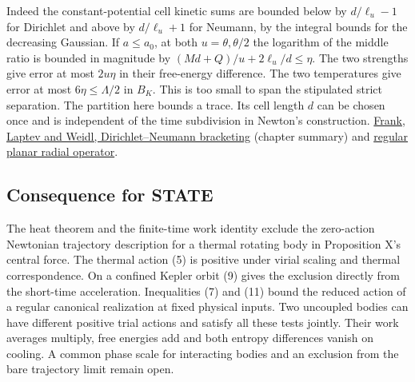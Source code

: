 \documentclass[11pt,a4paper]{article}
\begin{document}
Indeed the constant-potential cell kinetic sums are bounded below by
\(d/\ell_u-1\) for Dirichlet and above by \(d/\ell_u+1\) for Neumann, by
the integral bounds for the decreasing Gaussian. If \(a\le a_0\), at
both \(u=\theta,\theta/2\) the logarithm of the middle ratio is bounded
in magnitude by \((Md+Q)/u+2\ell_u/d\le\eta\). The two strengths give
error at most \(2u\eta\) in their free-energy difference. The two
temperatures give error at most \(6\eta\le\Lambda/2\) in \(B_K\). This
is too small to span the stipulated strict separation. The partition
here bounds a trace. Its cell length \(d\) can be chosen once and is
independent of the time subdivision in Newton's construction.
\href{https://doi.org/10.1017/9781009218436.007}{Frank, Laptev and
Weidl, Dirichlet--Neumann bracketing} (chapter summary) and
\href{self-sufficiency-contrast.md\#passivity-under-cyclic-changes-of-the-attraction}{regular
planar radial operator}.

\subsection{Consequence for STATE}\label{consequence-for-state}

The heat theorem and the finite-time work identity exclude the
zero-action Newtonian trajectory description for a thermal rotating body
in Proposition X's central force. The thermal action (5) is positive
under virial scaling and thermal correspondence. On a confined Kepler
orbit (9) gives the exclusion directly from the short-time acceleration.
Inequalities (7) and (11) bound the reduced action of a regular
canonical realization at fixed physical inputs. Two uncoupled bodies can
have different positive trial actions and satisfy all these tests
jointly. Their work averages multiply, free energies add and both
entropy differences vanish on cooling. A common phase scale for
interacting bodies and an exclusion from the bare trajectory limit
remain open.
\end{document}
